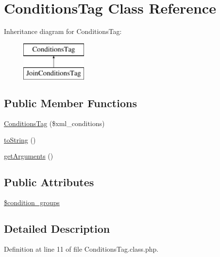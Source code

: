 \hypertarget{classConditionsTag}{\section{Conditions\+Tag Class Reference}
\label{classConditionsTag}
}
Inheritance diagram for Conditions\+Tag\+:\begin{figure}[H]
\begin{center}
\leavevmode
\includegraphics[height=2.000000cm]{classConditionsTag}
\end{center}
\end{figure}
\subsection*{Public Member Functions}
\begin{DoxyCompactItemize}
\item 
\hyperlink{classConditionsTag_ac5624e3b396995621ca7f0502dc5bd5c}{Conditions\+Tag} (\$xml\+\_\+conditions)
\item 
\hyperlink{classConditionsTag_af458fe76fa1ffb006306c682e024ee5a}{to\+String} ()
\item 
\hyperlink{classConditionsTag_a8c7e8f873db4fa6e6c35920bed31afae}{get\+Arguments} ()
\end{DoxyCompactItemize}
\subsection*{Public Attributes}
\begin{DoxyCompactItemize}
\item 
\hyperlink{classConditionsTag_a494a016d168c8e44cd05638e6c991805}{\$condition\+\_\+groups}
\end{DoxyCompactItemize}


\subsection{Detailed Description}


Definition at line 11 of file Conditions\+Tag.\+class.\+php.



